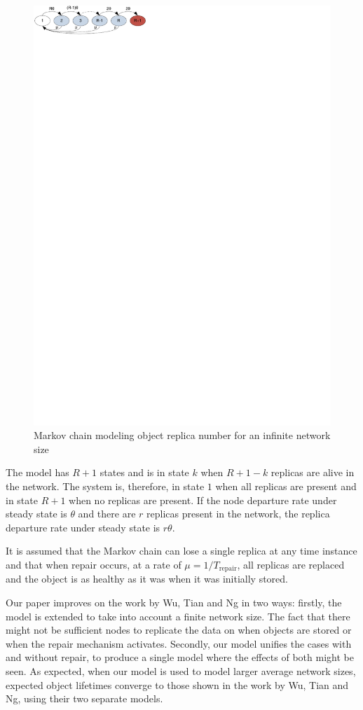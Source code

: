 \documentclass[10pt,a4paper,conference]{IEEEtran}
\begin{document}
\begin{figure}[htbp]
 \centering
 \includegraphics[clip=true, viewport=0.0cm 27.5cm 8.0cm 30.0cm, width=0.7\columnwidth]{inifinite_network_chain}
 \caption{Markov chain modeling object replica number for an infinite network size}
 \label{fig_other_markov_chain}
\end{figure}

The model has $R+1$ states and is in state $k$ when $R+1-k$ replicas are alive in the network. The system is, therefore, in state $1$ when all replicas are present and in state $R+1$ when no replicas are present. If the node departure rate under steady state is $\theta$ and there are $r$ replicas present in the network, the replica departure rate under steady state is $r\theta$.

It is assumed that the Markov chain can lose a single replica at any time instance and that when repair occurs, at a rate of $\mu = 1/T_{\textrm{repair}}$, all replicas are replaced and the object is as healthy as it was when it was initially stored.

Our paper improves on the work by Wu, Tian and Ng \cite{replication_article} in two ways: firstly, the model is extended to take into account a finite network size. The fact that there might not be sufficient nodes to replicate the data on when objects are stored or when the repair mechanism activates. Secondly, our model unifies the cases with and without repair, to produce a single model where the effects of both might be seen. As expected, when our model is used to model larger average network sizes, expected object lifetimes converge to those shown in the work by Wu, Tian and Ng, using their two separate models.
\end{document}
